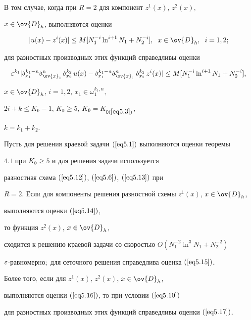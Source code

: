 В том случае, когда при $R=2$ для компонент $z^1(x)$, $z^2(x)$,


$x\in\ov{D}_h$, выполняются оценки


\begin{equation}


\label{eq5.16}


|u(x)-z^i(x)|\le M[N_1^{-i}\ln^{i+1}N_1+N_2^{-i}],\ \;


x\in\ov{D}_h,\ \; i=1,2;


\end{equation}


для разностных производных этих функций справедливы оценки


\begin{equation}


\label{eq5.17}


\eps^{k_1}|\delta_{x_1}^{k_1-n}\delta^n_{\ov{x}_1}\,\delta_{x_2}^{k_2}\,u(x)-


\delta_{x_1}^{k_1-n}\delta^n_{\ov{x}_1}\,\delta^{k_2}_{x_2}\,z^i(x)|\le


M[N_1^{-i}\ln^{i+1} N_1+N_2^{-i}],


\end{equation}


$x\in\ov{D}_h$, $i=1,2$, $x_1\in\omega_1^{k_1,n}$,


$2i+k\le K_0-1$, $K_0\ge 5$, $K_0=K_{0(\ref{eq5.3})}$,


$k=k_1+k_2$.





\begin{lems}


Пусть для решения краевой задачи $(\ref{eq5.1})$ выполняются оценки теоремы


$4.1$ при $K_0\ge 5$ и для решения задачи используется


разностная схема $(\ref{eq5.12})$, $(\ref{eq5.6})$, $(\ref{eq5.13})$ при


$R=2$. Если для компоненты решения разностной схемы $z^1(x)$, $x\in\ov{D}_h$,


выполняются оценки $(\ref{eq5.14})$,


то функция $z^2(x)$, $x\in\ov{D}_h$,


сходится к решению краевой задачи со скоростью $O(N_1^{-2}\ln^3 N_1+N_2^{-2})$


$\varepsilon$-равномерно$;$ для сеточного решения справедлива оценка $(\ref{eq5.15})$.


Более того, если для $z^1(x)$, $z^2(x)$, $x\in\ov{D}_h$,


выполняются оценки $(\ref{eq5.16})$, то при условии $(\ref{eq5.10})$


для разностных производных этих функций справедливы оценки $(\ref{eq5.17})$.


\end{lems}






